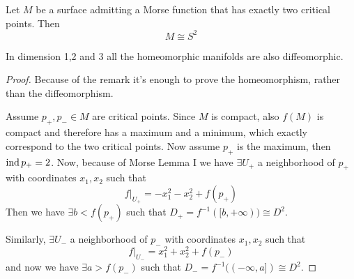 \begin{thm}
    Let $M$ be a surface admitting a Morse function that has exactly two critical points. Then
    \begin{equation}
        M \cong S^2
    \end{equation}
\end{thm}
\begin{rem}
    In dimension 1,2 and 3 all the homeomorphic manifolds are also diffeomorphic. 
\end{rem}
\begin{proof}
    Because of the remark it's enough to prove the homeomorphism, rather than the diffeomorphism.

    \noindent Assume $p_+, p_- \in M$ are critical points. Since $M$ is compact, also $f(M)$ is compact and therefore has a maximum and a minimum, which exactly correspond to the two critical points. Now assume $p_+$ is the maximum, then $\operatorname{ind} p_+ = 2$. Now, because of Morse Lemma I we have $\exists U_+$ a neighborhood of $p_+$ with coordinates $x_1, x_2$ such that 
    \begin{equation}
        f|_{U_+} = -x_1^2 - x_2^2 + f(p_+)
    \end{equation}
    Then we have $\exists b < f(p_+)$ such that $D_+ = f^{-1}([b, +\infty)) \cong D^2$.

    \noindent Similarly, $\exists U_-$ a neighborhood of $p_-$ with coordinates $x_1, x_2$ such that 
    \begin{equation}
        f|_{U_-} = x_1^2 + x_2^2 + f(p_-)
    \end{equation}
    and now we have $\exists a > f(p_-)$ such that $D_- = f^{-1}((-\infty,a]) \cong D^2$.


\end{proof}
